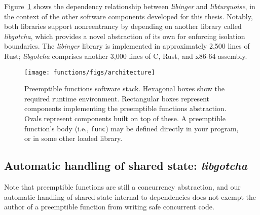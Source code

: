 Figure~\ref{fig:architecture} shows the dependency relationship between
\textit{libinger} and \textit{libturquoise}, in the context of the other software
components developed for this thesis.  Notably, both libraries support nonreentrancy
by depending on another library called \textit{libgotcha}, which provides a novel
abstraction of its own for enforcing isolation boundaries.  The \textit{libinger}
library is implemented in approximately 2,500 lines of Rust; \textit{libgotcha}
comprises another 3,000 lines of C, Rust, and x86-64 assembly.

\begin{figure}
\begin{center}
\texttt{[image: functions/figs/architecture]}
\end{center}
\caption{Preemptible functions software stack.  \textnormal{Hexagonal boxes show
the required runtime environment.  Rectangular boxes represent components
implementing the preemptible functions abstraction.  Ovals represent components built
on top of these.  A preemptible function's body (i.e., \texttt{func}) may be defined
directly in
your program, or in some other loaded library.}}
\label{fig:architecture}
\end{figure}


\subsection{Automatic handling of shared state: \textit{libgotcha}}
\label{sec:libinger:concurrency}

\begin{swallowsubsections}

\end{swallowsubsections}

Note that preemptible functions are still a concurrency abstraction, and our
automatic handling of shared state internal to dependencies does not exempt the
author of a preemptible function from writing safe concurrent code.
